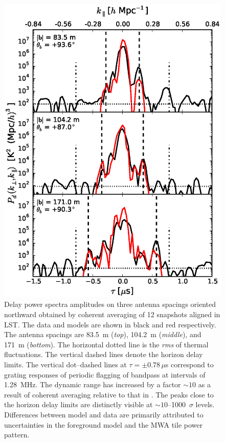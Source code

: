 \documentclass[preprint2,apjl,numberedappendix,twocolappendix,appendixfloats]{emulateapj}
\begin{document}
\begin{figure}[htb]
\centering
\includegraphics[width=\linewidth]{3_baseline_comparison_CLEAN_fhd_avg_visibilities_amplitudes_185.0_MHz_30.7_MHz.eps}
\caption{Delay power spectra amplitudes on three antenna spacings oriented northward obtained by coherent averaging of 12 snapshots aligned in LST. The data and models are shown in black and red respectively. The antenna spacings are 83.5~m ({\it top}), 104.2~m ({\it middle}), and 171~m ({\it bottom}). The horizontal dotted line is the {\it rms} of thermal fluctuations. The vertical dashed lines denote the horizon delay limits. The vertical dot--dashed lines at $\tau=\pm 0.78\,\mu$s correspond to grating responses of periodic flagging of bandpass at intervals of 1.28~MHz. The dynamic range has increased by a factor $\sim 10$ as a result of coherent averaging relative to that in \citet{thy15}. The peaks close to the horizon delay limits are distinctly visible at $\sim 10$--1000~$\sigma$ levels. Differences between model and data are primarily attributed to uncertainties in the foreground model and the MWA tile power pattern. \label{fig:3-baseline-comparison-delay-spectra}}
\end{figure}
\end{document}
